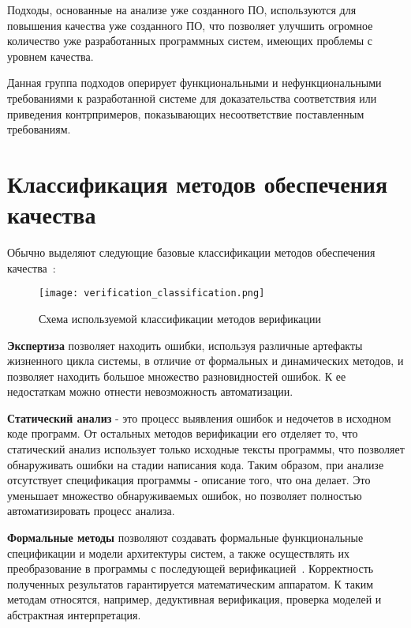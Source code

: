 Подходы, основанные на анализе уже созданного ПО, используются для повышения
качества уже созданного ПО, что позволяет улучшить огромное количество уже
разработанных программных систем, имеющих проблемы с уровнем качества.

Данная группа подходов оперирует функциональными и нефункциональными
требованиями к разработанной системе для доказательства соответствия или
приведения контрпримеров, показывающих несоответствие поставленным требованиям.

\section{Классификация методов обеспечения качества}

Обычно выделяют следующие базовые классификации методов обеспечения
качества~\cite{kulyamin}:

\begin{figure}[ht]
    \begin{center}
        \texttt{[image: verification\_classification.png]}
    \end{center}
    \caption{Схема используемой классификации методов верификации}
    \label{fig:verification_classification}
\end{figure}

\newpage

\textbf{Экспертиза} позволяет находить ошибки, используя различные артефакты
жизненного цикла системы, в отличие от формальных и динамических методов, и
позволяет находить большое множество разновидностей ошибок. К ее недостаткам
можно отнести невозможность автоматизации.

\textbf{Статический анализ} - это процесс выявления ошибок и недочетов в
исходном коде программ. От остальных методов верификации его отделяет то, что
статический анализ использует только исходные тексты программы, что позволяет
обнаруживать ошибки на стадии написания кода. Таким образом, при анализе
отсутствует спецификация программы - описание того, что она делает. Это
уменьшает множество обнаруживаемых ошибок, но позволяет полностью
автоматизировать процесс анализа.

\textbf{Формальные методы} позволяют создавать формальные функциональные
спецификации и модели архитектуры систем, а также осуществлять их преобразование
в программы с последующей верификацией~\cite{formal_methods}. Корректность
полученных результатов гарантируется математическим аппаратом. К таким методам
относятся, например, дедуктивная верификация, проверка моделей и абстрактная
интерпретация.

